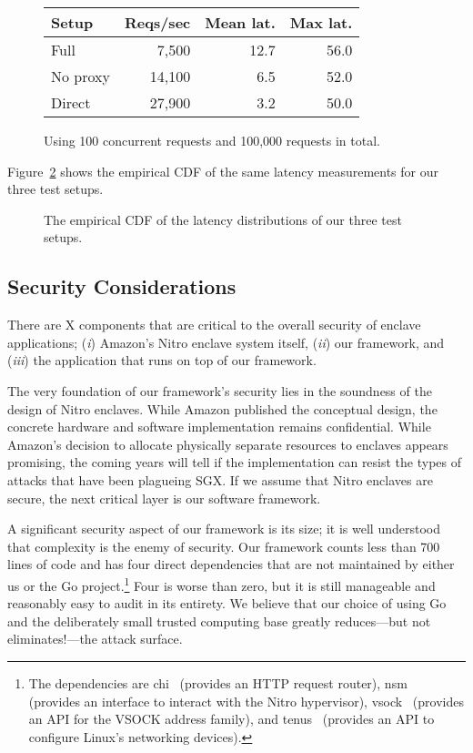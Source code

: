 \begin{figure}[t]
    \centering
    \begin{tabular}{l r r r}
    \toprule
    Setup & Reqs/sec & Mean lat. & Max lat. \\
    \midrule
    Full & 7,500 & 12.7 & 56.0 \\
    No proxy & 14,100 & 6.5 & 52.0 \\
    Direct & 27,900 & 3.2 & 50.0 \\
    \bottomrule
    \end{tabular}
    \caption{Using 100 concurrent requests and 100,000 requests in total.}
    \label{fig:latency-msmts}
\end{figure}

Figure~\ref{fig:latency-cdf} shows the empirical CDF of the same latency
measurements for our three test setups.

\begin{figure}[t]
    \centering
    
    \label{fig:latency-cdf}
    \caption{The empirical CDF of the latency distributions of our three test setups.}
\end{figure}

\subsection{Security Considerations}
\label{sec:security}

There are X components that are critical to the overall security of enclave
applications; (\emph{i}) Amazon's Nitro enclave system itself,
(\emph{ii}) our framework, and (\emph{iii}) the application that runs on top of
our framework.

The very foundation of our framework's security lies in the soundness of the
design of Nitro enclaves.  While Amazon published the conceptual design, the
concrete hardware and software implementation remains confidential.  While
Amazon's decision to allocate physically separate resources to enclaves appears
promising, the coming years will tell if the implementation can resist the types
of attacks that have been plagueing SGX.  If we assume that Nitro enclaves are
secure, the next critical layer is our software framework.

A significant security aspect of our framework is its size; it is well
understood that complexity is the enemy of security.  Our framework counts less
than 700 lines of code and has four direct dependencies that are not maintained
by either us or the Go project.\footnote{The dependencies are chi~\cite{chi}
(provides an HTTP request router), nsm~\cite{nsm} (provides an interface to
interact with the Nitro hypervisor), vsock~\cite{vsock} (provides an API for the
VSOCK address family), and tenus~\cite{tenus} (provides an API to configure
Linux's networking devices).} Four is worse than zero, but it is still
manageable and reasonably easy to audit in its entirety.  We believe that our
choice of using Go and the deliberately small trusted computing base greatly
reduces---but not eliminates!---the attack surface.

